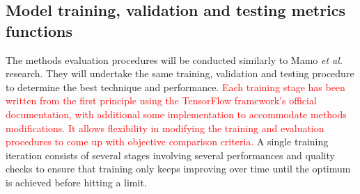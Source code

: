 \subsection{Model training, validation and testing metrics functions} \label{subsec:t_model}
%
The methods evaluation procedures will be conducted similarly to Mamo \textit{et al.}~\cite{mamo_long_2020} research.
They will undertake the same training, validation and testing procedure to determine the best technique and performance.
\textcolor{red}{Each training stage has been written from the first principle using the TensorFlow framework's official documentation, with additional some implementation to accommodate methods modifications\cite{}.
It allows flexibility in modifying the training and evaluation procedures to come up with objective comparison criteria.}
A single training iteration consists of several stages involving several performances and quality checks to ensure that training only keeps improving over time until the optimum is achieved before hitting a limit.


